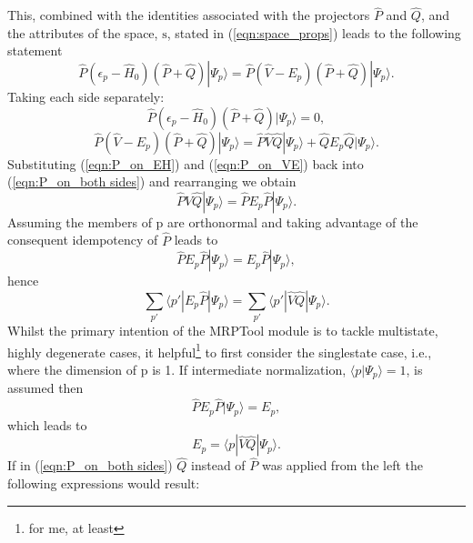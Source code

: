 This, combined with the identities associated with the projectors $\hat{P}$ and $\hat{Q}$, and the
attributes of the space, $\mathrm{s}$, stated in (\ref{eqn:space_props}) leads to the following statement
\begin{equation}
\hat{P}(\epsilon_{p} - \hat{H}_{0})(\hat{P}+\hat{Q})| \Psi_{p} \rangle  =  \hat{P}(\hat{V}-E_{p})(\hat{P}+\hat{Q})|\Psi_{p} \rangle .
\label{eqn:P_on_both sides}
\end{equation}
Taking each side separately:
\begin{equation}
\hat{P}(\epsilon_{p} - \hat{H}_{0})(\hat{P}+\hat{Q})| \Psi_{p} \rangle  = 0  ,
\label{eqn:P_on_EH}
\end{equation}
\begin{equation}
\hat{P}(\hat{V}-E_{p})(\hat{P}+\hat{Q})|\Psi_{p} \rangle = \hat{P}\hat{V}\hat{Q}|\Psi_{p} \rangle + \hat{Q}E_{p}\hat{Q}|\Psi_{p}\rangle .
\label{eqn:P_on_VE}
\end{equation}
Substituting (\ref{eqn:P_on_EH}) and (\ref{eqn:P_on_VE}) back into (\ref{eqn:P_on_both sides}) and rearranging we obtain
\begin{equation}
\hat{P}\hat{V}\hat{Q}|\Psi_{p} \rangle =  \hat{P}E_{p}\hat{P}|\Psi_{p}\rangle .
\label{eqn:pt_energy}
\end{equation}
Assuming the members of $\mathrm{p}$ are orthonormal and taking advantage of the consequent idempotency of $\hat{P}$ leads to
\begin{equation}
\hat{P}E_{p}\hat{P}|\Psi_{p}\rangle = E_{p}\hat{P}|\Psi_{p} \rangle ,
\end{equation}
hence
\begin{equation}
\sum_{p'} \langle p' | E_{p}\hat{P}|\Psi_{p} \rangle  =  \sum_{p'} \langle p' | \hat{V}\hat{Q}|\Psi_{p} \rangle.
\label{eqn:multistate_pt_energy}
\end{equation}
Whilst the primary intention of the MRPTool module is to tackle multistate, highly degenerate cases, it helpful\footnote{for me, at least} 
to first consider the singlestate case, i.e., where the dimension of $\mathrm{p}$ is 1. 
If intermediate normalization, $\langle p | \Psi_{p} \rangle = 1$, is assumed then 
\begin{equation}
\hat{P}E_{p}\hat{P}|\Psi_{p}\rangle = E_{p},
\end{equation}
which leads to 
\begin{equation}
E_{p} = \langle p | \hat{V}\hat{Q}|\Psi_{p} \rangle.
\label{eqn:singlestate_pt_energy}
\end{equation}
If in (\ref{eqn:P_on_both sides}) $\hat{Q}$ instead of $\hat{P}$ was applied from the left the following expressions would result:
